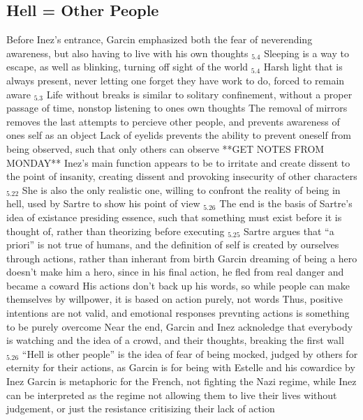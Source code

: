 \documentclass[11 pt, twoside]{article}
\newenvironment{outline*}
{
	\begin{outline}[enumerate]
	}
	{\end{outline}
}
\newcommand{\footb}[2]{\hyperlink{#1}{$_{#1.#2}$}}
\begin{document}
\subsection{Hell = Other People}
\begin{outline*}
\1 Before Inez's entrance, Garcin emphasized both the fear of neverending awareness, but also having to live with his own thoughts \footb{5}{4}
\2 Sleeping is a way to escape, as well as blinking, turning off sight of the world \footb{5}{4}
\2 Harsh light that is always present, never letting one forget they have work to do, forced to remain aware \footb{5}{3}
\1 Life without breaks is similar to solitary confinement, without a proper passage of time, nonstop listening to ones own thoughts
\2 The removal of mirrors removes the last attempts to percieve other people, and prevents awareness of ones self as an object
\2 Lack of eyelids prevents the ability to prevent oneself from being observed, such that only others can observe
\1 **GET NOTES FROM MONDAY** 
\1 Inez's main function appears to be to irritate and create dissent to the point of insanity, creating dissent and provoking insecurity of other characters \footb{5}{22}
\2 She is also the only realistic one, willing to confront the reality of being in hell, used by Sartre to show his point of view  \footb{5}{26}
\1 The end is the basis of Sartre's idea of existance presiding essence, such that something must exist before it is thought of, rather than theorizing before executing \footb{5}{25}
\2 Sartre argues that ``a priori'' is not true of humans, and the definition of self is created by ourselves through actions, rather than inherant from birth
\2 Garcin dreaming of being a hero doesn't make him a hero, since in his final action, he fled from real danger and became a coward
\2 His actions don't back up his words, so while people can make themselves by willpower, it is based on action purely, not words
\2 Thus, positive intentions are not valid, and emotional responses prevnting actions is something to be purely overcome
\1 Near the end, Garcin and Inez acknoledge that everybody is watching and the idea of a crowd, and their thoughts, breaking the first wall \footb{5}{26}
\2 ``Hell is other people'' is the idea of fear of being mocked, judged by others for eternity for their actions, as Garcin is for being with Estelle and his cowardice by Inez
\2 Garcin is metaphoric for the French, not fighting the Nazi regime, while Inez can be interpreted as the regime not allowing them to live their lives without judgement, or just the resistance critisizing their lack of action
\end{outline*}
\end{document}
